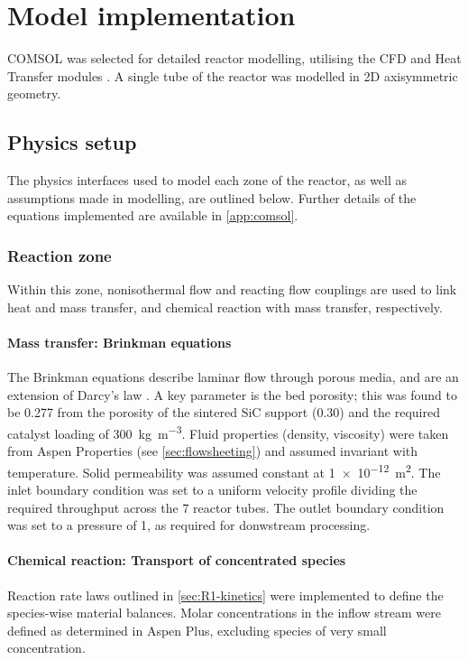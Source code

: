 \section{Model implementation}
\label{sec: modelimplementation}
COMSOL was selected for detailed reactor modelling, utilising the CFD and Heat Transfer modules \cite{comsol_comsol_2020,comsol_cfd_2020,comsol_heat_2020}. A single tube of the reactor was modelled in 2D axisymmetric geometry.

\subsection{Physics setup}
The physics interfaces used to model each zone of the reactor, as well as assumptions made in modelling, are outlined below. Further details of the equations implemented are available in \cref{app:comsol}.

\subsubsection{Reaction zone}

Within this zone, nonisothermal flow and reacting flow couplings are used to link heat and mass transfer, and chemical reaction with mass transfer, respectively.

\paragraph{Mass transfer: Brinkman equations}
The Brinkman equations describe laminar flow through porous media, and are an extension of Darcy's law \cite{comsol_cfd_2020}. A key parameter is the bed porosity; this was found to be \num{0.277} from the porosity of the sintered SiC support (0.30) and the required catalyst loading of \SI{300}{\kg\per\cubic\m}. Fluid properties (density, viscosity) were taken from Aspen Properties (see \cref{sec:flowsheeting}) and assumed invariant with temperature. Solid permeability was assumed constant at \SI{1e-12}{\square\m}. The inlet boundary condition was set to a uniform velocity profile dividing the required throughput across the 7 reactor tubes. The outlet boundary condition was set to a pressure of \SI{1}{\atm}, as required for donwstream processing.

\paragraph{Chemical reaction: Transport of concentrated species}
Reaction rate laws outlined in \cref{sec:R1-kinetics} were implemented to define the species-wise material balances. Molar concentrations in the inflow stream were defined as determined in Aspen Plus, excluding species of very small concentration.

